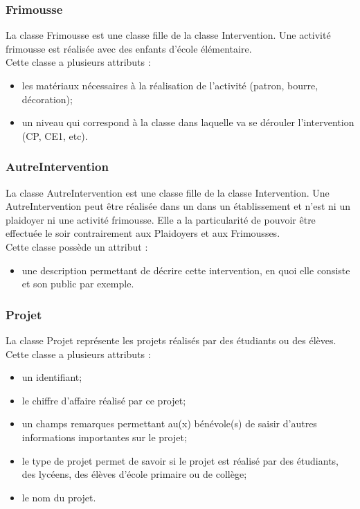 \subsubsection*{Frimousse}
La classe Frimousse est une classe fille de la classe Intervention. Une activité frimousse est réalisée avec des enfants d'école élémentaire. \\
Cette classe a plusieurs attributs :
\begin{itemize}
\item les matériaux nécessaires à la réalisation de l'activité (patron, bourre, décoration);
\item un niveau qui correspond à la classe dans laquelle va se dérouler l'intervention (CP, CE1, etc).
\end{itemize}

\subsubsection*{AutreIntervention}
La classe AutreIntervention est une classe fille de la classe Intervention. Une AutreIntervention peut être réalisée dans un dans un établissement et n'est ni un plaidoyer ni une activité frimousse. Elle a la particularité de pouvoir être effectuée le soir contrairement aux Plaidoyers et aux Frimousses. \\
Cette classe possède un attribut :
\begin{itemize}
\item une description permettant de décrire cette intervention, en quoi elle consiste et son public par exemple.
\end{itemize}

\subsubsection*{Projet}
La classe Projet représente les projets réalisés par des étudiants ou des élèves.\\
Cette classe a plusieurs attributs : 
\begin{itemize}
\item un identifiant;
\item le chiffre d'affaire réalisé par ce projet;
\item un champs remarques permettant au(x) bénévole(s) de saisir d'autres informations importantes sur le projet;
\item le type de projet permet de savoir si le projet est réalisé par des étudiants, des lycéens, des élèves d'école primaire ou de collège;
\item le nom du projet.
\end{itemize}

